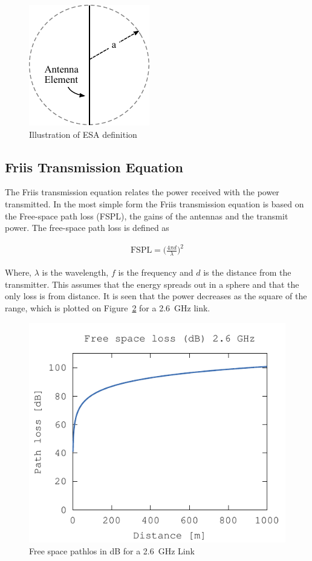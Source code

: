 \begin{figure}[htbp]
  \centering
  \includegraphics[scale=1]{img/analysis/ESA}
  \caption{Illustration of ESA definition}
  \label{fig:ant-esa-def}
\end{figure}

\subsection{Friis Transmission Equation}
The Friis transmission equation relates the power received with the power transmitted. In the most simple form the Friis transmission equation is based on the Free-space path loss (FSPL), the gains of the antennas and the transmit power. The free-space path loss is defined as

\begin{align}
  \label{eq:fspl}
  \text{FSPL} = \big( \frac{4 \pi d}{\lambda} \big)^2
\end{align}

Where, $\lambda$ is the wavelength, $f$ is the frequency and $d$ is the distance from the transmitter. This assumes that the energy spreads out in a sphere and that the only loss is from distance. It is seen that the power decreases as the square of the range, which is plotted on Figure~\ref{fig:fspl-plot} for a \SI{2.6}{GHz} link.

\begin{figure}[htbp]
  \centering
  \includegraphics[scale=1]{img/analysis/distancePathloss}
  \caption{Free space pathlos in dB for a \SI{2.6}{GHz} Link}
  \label{fig:fspl-plot}
\end{figure}

